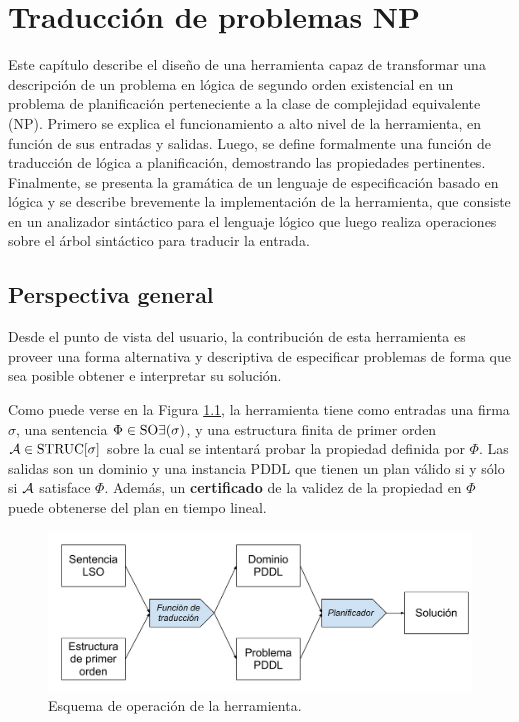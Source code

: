 
\chapter{Traducción de problemas NP}
\label{Chapter2}
Este capítulo describe el diseño de una herramienta capaz de transformar una
descripción de un problema en lógica de segundo orden existencial
en un problema de planificación perteneciente a la clase de complejidad
equivalente (NP).
Primero se explica el funcionamiento a alto nivel de la herramienta, en función
de sus entradas y salidas. Luego, se define formalmente una función de
traducción de lógica a planificación, demostrando las propiedades pertinentes.
Finalmente, se presenta la gramática de un lenguaje de especificación basado en lógica 
y se describe brevemente la implementación de la herramienta, que consiste en un 
analizador sintáctico para el lenguaje lógico que luego realiza operaciones
sobre el árbol sintáctico para traducir la entrada.

\section{Perspectiva general}
Desde el punto de vista del usuario, la contribución de esta herramienta es
proveer una forma alternativa y descriptiva de especificar problemas de forma
que sea posible obtener e interpretar su solución.

Como puede verse en la Figura \ref{esquema_herramienta}, la herramienta tiene
como entradas una firma $\sigma$, una sentencia $\Phi\in\text{SO}\exists(\sigma)$, y
una estructura finita de primer orden $\mathcal{A}\in\text{STRUC}[\sigma]$ sobre la cual se
intentará probar la propiedad definida por $\Phi$.
Las salidas son un dominio y una instancia PDDL que tienen un plan válido si y
sólo si $\mathcal{A}$ satisface $\Phi$. Además, un \textbf{certificado} de la validez de
la propiedad en $\Phi$ puede obtenerse del plan en tiempo lineal.

\begin{figure}[h]
\centering
\includegraphics[width=\textwidth]{figuras/esquema_herramienta.pdf}
\caption{Esquema de operación de la herramienta.}
\label{esquema_herramienta}
\end{figure}

